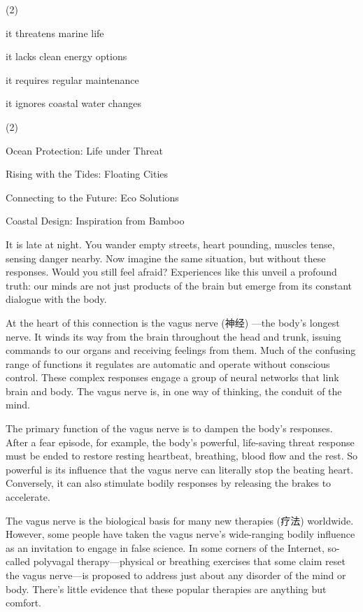 \documentclass{英语试卷}
\begin{document}
\begin{choices}(2)
  \item it threatens marine life
  \item it lacks clean energy options
  \item it requires regular maintenance
  \item it ignores coastal water changes
\end{choices}
\begin{choices}(2)
  \item Ocean Protection: Life under Threat
  \item Rising with the Tides: Floating Cities
  \item Connecting to the Future: Eco Solutions
  \item Coastal Design: Inspiration from Bamboo
\end{choices}
\par It is late at night. You wander empty streets, heart pounding, muscles tense, sensing danger nearby. Now imagine the same situation, but without these responses. Would you still feel afraid? Experiences like this unveil a profound truth: our minds are not just products of the brain but emerge from its constant dialogue with the body.\par
\par At the heart of this connection is the vagus nerve (神经) —the body's longest nerve. It winds its way from the brain throughout the head and trunk, issuing commands to our organs and receiving feelings from them. Much of the confusing range of functions it regulates are automatic and operate without conscious control. These complex responses engage a group of neural networks that link brain and body. The vagus nerve is, in one way of thinking, the conduit of the mind.\par
\par The primary function of the vagus nerve is to dampen the body's responses. After a fear episode, for example, the body's powerful, life-saving threat response must be ended to restore resting heartbeat, breathing, blood flow and the rest. So powerful is its influence that the vagus nerve can literally stop the beating heart. Conversely, it can also stimulate bodily responses by releasing the brakes to accelerate.\par
\par The vagus nerve is the biological basis for many new therapies (疗法) worldwide. However, some people have taken the vagus nerve's wide-ranging bodily influence as an invitation to engage in false science. In some corners of the Internet, so-called polyvagal therapy—physical or breathing exercises that some claim reset the vagus nerve—is proposed to address just about any disorder of the mind or body. There's little evidence that these popular therapies are anything but comfort.\par
\end{document}
